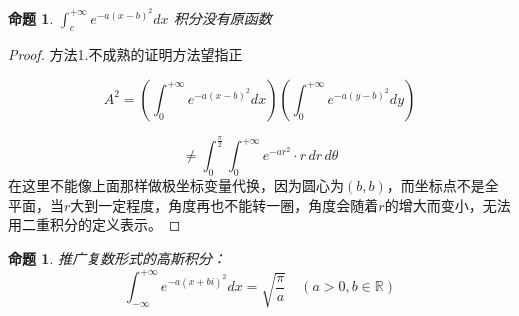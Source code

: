 \documentclass[12pt,a4paper]{article}
\numberwithin{subsection}{section}   %
\numberwithin{subsubsection}{subsection}
\theoremstyle{plain}
\newtheorem{proposition}[theorem]{命题}
\theoremstyle{definition}
\theoremstyle{remark}
\theoremstyle{remark}
\begin{document}
	\begin{proposition}
		\label{ex:2}
		$	\int_{c}^{+\infty} e^{-a(x-b)^2} dx$
		积分没有原函数
	\end{proposition}
	
	\begin{proof}
		
		
		方法1.不成熟的证明方法望指正
		
		
		
		
		
		\begin{equation*}
			A^2 = \left( \int_{0}^{+\infty} e^{-a(x-b)^2} dx \right) \left( \int_{0}^{+\infty} e^{-a(y-b)^2} dy \right)
		\end{equation*}
		
		\begin{equation*}
			\neq \int_{0}^{\frac{\pi}{2}} \int_{0}^{+\infty} e^{-ar^2} \cdot r \, dr \, d\theta
		\end{equation*}
		在这里不能像上面那样做极坐标变量代换，因为圆心为$(b,b)$，而坐标点不是全平面，当$r$大到一定程度，角度再也不能转一圈，角度会随着$r$的增大而变小，无法用二重积分的定义表示。
		
		
	\end{proof}
	
	
	\begin{proposition}
		\label{ex:2}
		推广复数形式的高斯积分：
		\begin{equation}
			\int_{-\infty}^{+\infty} e^{-a(x+bi)^2} dx = \sqrt{\frac{\pi}{a}} \quad (a>0, b \in \mathbb{R})
		\end{equation}
	\end{proposition}
	
\end{document}
